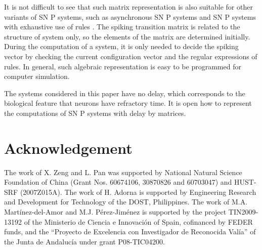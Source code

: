 \documentclass[runningheads]{llncs}
\begin{document}
It is not difficult to see that such matrix representation is also
suitable for other variants of SN P systems, such as asynchronous SN
P systems \cite{Asynchronous} and SN P systems with exhaustive use
of rules \cite{Ionescu2}. The spiking transition matrix is related
to the structure of system only, so the elements of the matrix are
determined initially. During the computation of a system, it is only
needed to decide the spiking vector by checking the current
configuration vector and the regular expressions of rules. In
general, such algebraic representation is easy to be programmed for
computer simulation.

The systems considered in this paper have no delay, which
corresponds to the biological feature that neurons have refractory
time. It is open how to represent the computations of SN P systems
with delay by matrices.

\section*{Acknowledgement}
The work of X. Zeng and L. Pan was supported by National Natural
Science Foundation of China (Grant Nos. 60674106, 30870826 and
60703047) and HUST-SRF (2007Z015A). The work of  H. Adorna is
supported by Engineering Research and Development for Technology of
the DOST, Philippines. The work of M.A. Mart\'inez-del-Amor and M.J.
P\'erez-Jim\'enez is supported by the project TIN2009-13192 of the
Ministerio de Ciencia e Innovaci\'on of Spain, cofinanced by FEDER
funds, and the ``Proyecto de Excelencia con Investigador de
Reconocida Val\'ia'' of the Junta de Andaluc\'{i}a under grant
P08-TIC04200.

\nocite{*}
%
%
\end{document}
